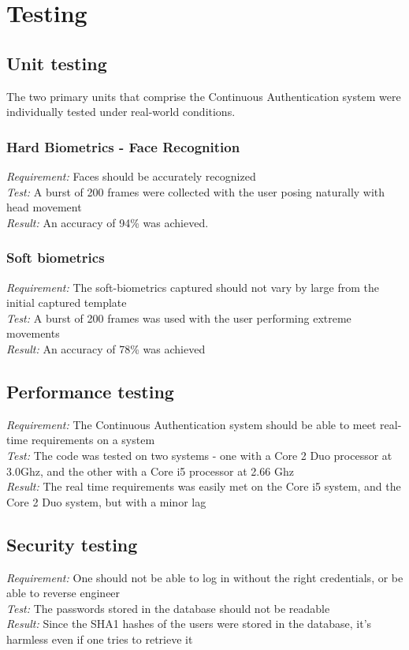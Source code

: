 \documentclass[12pt]{report}			%
\begin{document}
\newpage
\chapter{ Testing }

\section{ Unit testing }
The two primary units that comprise the Continuous Authentication system were individually tested under real-world conditions.

\subsection{ Hard Biometrics - Face Recognition }
\emph{ Requirement: } Faces should be accurately recognized\\
\emph{ Test: } A burst of 200 frames were collected with the user posing naturally with head movement\\
\emph{ Result: } An accuracy of 94\% was achieved.\\

\subsection{ Soft biometrics }
\emph{ Requirement: } The soft-biometrics captured should not vary by large from the initial captured template\\
\emph{ Test: } A burst of 200 frames was used with the user performing extreme movements\\
\emph{ Result: } An accuracy of 78\% was achieved\\

\section{ Performance testing } 
\emph{ Requirement: } The Continuous Authentication system should be able to meet real-time requirements on a system\\
\emph{ Test: } The code was tested on two systems - one with a Core 2 Duo processor at 3.0Ghz, and the other with a Core i5 processor at 2.66 Ghz\\
\emph{ Result: } The real time requirements was easily met on the Core i5 system, and the Core 2 Duo system, but with a minor lag\\

\section{ Security testing}
\emph{ Requirement: } One should not be able to log in without the right credentials, or be able to reverse engineer\\
\emph{ Test: } The passwords stored in the database should not be readable\\
\emph{ Result: } Since the SHA1 hashes of the users were stored in the database, it's harmless even if one tries to retrieve it\\
\end{document}
